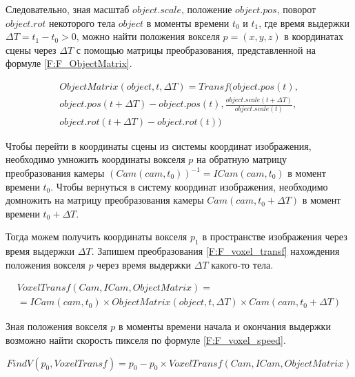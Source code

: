 Следовательно, зная масштаб $object.scale$, положение $object.pos$, поворот $object.rot$ некоторого тела $object$ в моменты времени $t_0$ и $t_1$, где время выдержки $\Delta T = t_1 - t_0 > 0$, можно найти положения вокселя $p = (x,y,z)$ в координатах сцены через $\Delta T$ с помощью матрицы преобразования, представленной на формуле \eqref{F:F_ObjectMatrix}.


\begin{equation}
    \label{F:F_ObjectMatrix}
    \begin{matrix}
        {
            ObjectMatrix(object, t, \Delta T) =
            Transf(
            object.pos(t),
        } \\

        {
        object.pos(t + \Delta T) - object.pos(t),

        }
        {\frac{object.scale(t + \Delta T)}{object.scale(t)}, }\\{  object.rot(t + \Delta T) - object.rot(t))}
    \end{matrix}
\end{equation}


Чтобы перейти в координаты сцены из системы координат изображения, необходимо умножить координаты вокселя $p$ на обратную матрицу преобразования камеры $(Cam(cam, t_0))^{-1} = ICam(cam, t_0)$ в момент времени $t_0$. Чтобы вернуться в систему координат изображения, необходимо домножить на матрицу преобразования камеры $Cam(cam, t_0 + \Delta T)$ в момент времени $t_0 + \Delta T$.

Тогда можем получить координаты вокселя $p_1$ в пространстве изображения через время выдержки $\Delta T$. Запишем преобразования \eqref{F:F_voxel_transf} нахождения положения вокселя $p$ через время выдержки $\Delta T$ какого-то тела.

\begin{equation}
    \label{F:F_voxel_transf}
    \begin{matrix}
        {VoxelTransf(Cam, ICam, ObjectMatrix) =} \\
        {= ICam(cam, t_0) \times ObjectMatrix(object, t, \Delta T) \times Cam(cam, t_0 + \Delta T)}
    \end{matrix}
\end{equation}

Зная положения вокселя $p$ в моменты времени начала и окончания выдержки возможно найти скорость пикселя по формуле \eqref{F:F_voxel_speed}.

\begin{eqndesc}
    \begin{equation}
        \label{F:F_voxel_speed}
        FindV(p_0, VoxelTransf) = p_0 - p_0 \times VoxelTransf(Cam, ICam, ObjectMatrix)
    \end{equation}
\end{eqndesc}
